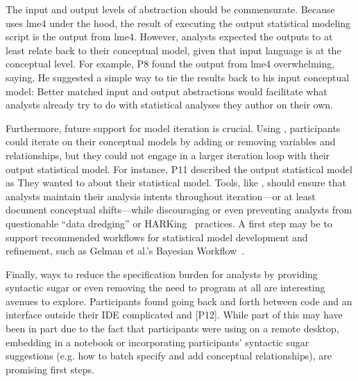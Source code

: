 The input and output levels of abstraction should be commensurate. Because
\rTisane uses lme4 under the hood, the result of executing the output
statistical modeling script is the output from lme4. However, analysts expected
the outputs to at least relate back to their conceptual model, given that
\rTisanes input language is at the conceptual level. For example, P8 found the
output from lme4 overwhelming, saying,  He suggested a simple way to
tie the results back to his input conceptual model: 
Better matched input and output abstractions would facilitate what analysts
already try to do with statistical analyses they author on their own.

Furthermore, future support for model iteration is crucial. Using \rTisane,
participants could iterate on their conceptual models by adding or removing
variables and relationships, but they could not engage in a larger iteration
loop with their output statistical model. 
For instance, P11 described the \rTisane output statistical model as
 They wanted to  about
their statistical model. Tools, like \rTisane, should ensure that analysts
maintain their analysis intents throughout iteration---or at least document
conceptual shifts---while discouraging or even preventing analysts from
questionable ``data dredging'' or HARKing~\cite{kerr1998harking} practices. A
first step may be to support recommended workflows for statistical model
development and refinement, such as Gelman et al.'s Bayesian
Workflow~\cite{gelman2020modelExpansion}.

Finally, ways to reduce the specification burden for analysts by providing
syntactic sugar or even removing the need to program at all are interesting
avenues to explore. Participants found going back and forth between code and an
interface outside their IDE complicated and  [P12]. While
part of this may have been in part due to the fact that participants were using
\rTisane on a remote desktop, embedding \rTisane in a notebook or incorporating
participants' syntactic sugar suggestions (e.g. how to batch specify and add
conceptual relationships), are promising first steps. 